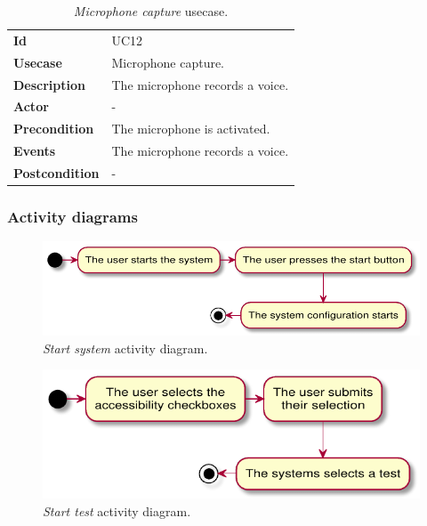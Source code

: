 \begin{table}[h!t]
    \centering
    \caption{\emph{Microphone capture} usecase.}
    \label{tab:uc:microphone}
    \centering
    \begin{tabular}{l | p{80mm}}
        \textbf{Id}            & UC12                            \\
        \textbf{Usecase}       & Microphone capture.             \\
        \textbf{Description}   & The microphone records a voice. \\
        \textbf{Actor}         & -                               \\
        \textbf{Precondition}  & The microphone is activated.    \\
        \textbf{Events}        & The microphone records a voice. \\
        \textbf{Postcondition} & -
    \end{tabular}
\end{table}

\clearpage
\subsubsection{Activity diagrams}
\begin{figure}[h!t]
    \centering
    \includegraphics[scale=0.8]{assets/plantuml/pdf/activity/system.pdf}
    \caption{\emph{Start system} activity diagram.}
    \label{fig:activity:start}
\end{figure}

\begin{figure}[h!t]
    \centering
    \includegraphics[scale=0.8]{assets/plantuml/pdf/activity/test.pdf}
    \caption{\emph{Start test} activity diagram.}
    \label{fig:activity:test}
\end{figure}


